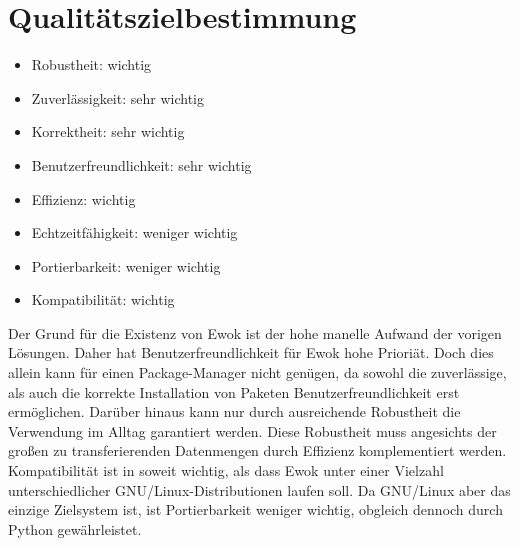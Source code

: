 \chapter{Qualitätszielbestimmung}

\begin{itemize}
	\item Robustheit: wichtig
	\item Zuverlässigkeit: sehr wichtig
	\item Korrektheit: sehr wichtig
	\item Benutzerfreundlichkeit: sehr wichtig
	\item Effizienz: wichtig
	\item Echtzeitfähigkeit: weniger wichtig
	\item Portierbarkeit: weniger wichtig
	\item Kompatibilität: wichtig
\end{itemize}

Der Grund für die Existenz von Ewok ist der hohe manelle Aufwand der vorigen Lösungen.
Daher hat Benutzerfreundlichkeit für Ewok hohe Prioriät.
Doch dies allein kann für einen Package-Manager nicht genügen, da sowohl die zuverlässige, als auch die korrekte Installation von Paketen Benutzerfreundlichkeit erst ermöglichen. Darüber hinaus kann nur durch ausreichende Robustheit die Verwendung im Alltag garantiert werden. Diese Robustheit muss angesichts der großen zu transferierenden Datenmengen durch Effizienz komplementiert werden.
Kompatibilität ist in soweit wichtig, als dass Ewok unter einer Vielzahl unterschiedlicher GNU/Linux-Distributionen laufen soll. Da GNU/Linux aber das einzige Zielsystem ist, ist Portierbarkeit weniger wichtig, obgleich dennoch durch Python gewährleistet.
 